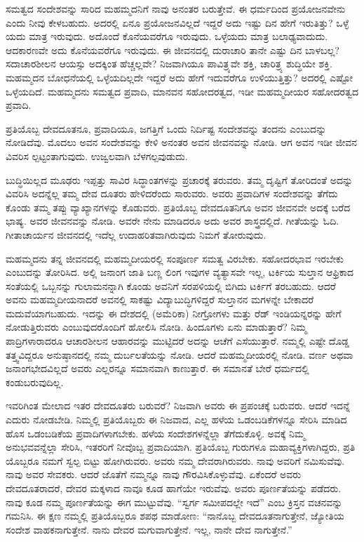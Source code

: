 ಸಮತ್ವದ ಸಂದೇಶವನ್ನು ಸಾರಿದ ಮಹಮ್ಮದನಿಗೆ ನಾವು ಅನಂತರ ಬರುತ್ತೇವೆ. ಈ ಧರ್ಮದಿಂದ ಪ್ರಯೋಜನವೇನು ಎಂದು ನೀವು ಕೇಳಬಹುದು. ಅದರಲ್ಲಿ ಏನೂ ಪ್ರಯೋಜನವಿಲ್ಲದೆ ಇದ್ದರೆ ಅದು ಇಷ್ಟು ದಿನ ಹೇಗೆ ಇರುತಿತ್ತು? ಒಳ್ಳೆ ಯದು ಮಾತ್ರ ಇರುವುದು. ಅದೊಂದೆ ಕೊನೆಯವರೆಗೂ ಇರುವುದು. ಒಳ್ಳೆಯದು ಮಾತ್ರ ಬಲಾಢ್ಯವಾದುದು. ಆದಕಾರಣವೇ ಅದು ಕೊನೆಯವರೆಗೂ ಇರುವುದು. ಈ ಜೀವನದಲ್ಲಿ ದುರಾಚಾರಿ ತಾನೇ ಎಷ್ಟು ದಿನ ಬಾಳಬಲ್ಲ? ಸದಾಚಾರಶೀಲನ ಆಯಸ್ಸು ಅದಕ್ಕಿಂತ ಹೆಚ್ಚಲ್ಲವೇ? ನಿಜವಾಗಿಯೂ ಪಾವಿತ್ರ್ಯವೇ ಶಕ್ತಿ, ಚಾರಿತ್ರ್ಯ ಶುದ್ಧಿಯೇ ಶಕ್ತಿ. ಮಹಮ್ಮದನ ಬೋಧನೆಯಲ್ಲಿ ಒಳ್ಳೆಯದಿಲ್ಲದೇ ಇದ್ದರೆ ಅದು ಹೇಗೆ ಇದುವರೆಗೂ ಉಳಿಯುತ್ತಿತ್ತು? ಅದರಲ್ಲಿ ಎಷ್ಟೋ ಒಳ್ಳೆಯದಿದೆ. ಮಹಮ್ಮದನು ಸಮತ್ವದ ಪ್ರವಾದಿ, ಮಾನವನ ಸಹೋದರತ್ವದ, ಇಡೀ ಮಹಮ್ಮದೀಯರ ಸಹೋದರತ್ವದ ಪ್ರವಾದಿ.

ಪ್ರತಿಯೊಬ್ಬ ದೇವದೂತನೂ, ಪ್ರವಾದಿಯೂ, ಜಗತ್ತಿಗೆ ಒಂದು ನಿರ್ದಿಷ್ಟ ಸಂದೇಶವನ್ನು ತಂದನು ಎಂಬುದನ್ನು ನೋಡಿದೆವು. ಮೊದಲು ಅವನ ಸಂದೇಶವನ್ನು ಕೇಳಿ ಅನಂತರ ಅವನ ಜೀವನವನ್ನು ನೋಡಿ. ಆಗ ಅವನ ಇಡೀ ಜೀವನ ವಿವರಿಸ ಲ್ಪಟ್ಟಂತಾಗುವುದು. ಉಜ್ವಲವಾಗಿ ಬೆಳಗಲ್ಪವುಡುದು.

ಬುದ್ಧಿಯಿಲ್ಲದ ಮೂಢರು ಇಪ್ಪತ್ತು ಸಾವಿರ ಸಿದ್ಧಾಂತಗಳನ್ನು ಪ್ರಚಾರಕ್ಕೆ ತರುವರು. ತಮ್ಮ ದೃಷ್ಟಿಗೆ ತೋರಿದಂತೆ ಅದನ್ನು ವಿವರಿಸಿ ಅದನ್ನೆಲ್ಲ ತಮ್ಮ ದೇವ ದೂತರು ಹೇಳಿದರೆಂದು ಸಾರುವರು. ಅವರು ಪ್ರವಾದಿಗಳ ಸಂದೇಶವನ್ನು ತೆಗೆದು ಕೊಂಡು ತಮ್ಮ ತಪ್ಪು ವ್ಯಾಖ್ಯಾನಗಳನ್ನು ಕೊಡುವರು. ಪ್ರತಿಯೊಬ್ಬ ದೇವದೂತನಿಗೂ ಅವನ ಜೀವನವೇ ಅದಕ್ಕೆ ಬರೆದ ಭಾಷ್ಯ. ಅವರ ಜೀವನವನ್ನು ನೋಡಿ. ಅವರೇ ನೇನು ಮಾಡಿದರೂ ಅದು ಅವರ ಶಾಸ್ತ್ರದಲ್ಲಿದೆ. ಗೀತೆಯನ್ನು ಓದಿ. ಗೀತಾಚಾರ್ಯನ ಜೀವನದಲ್ಲಿ ಇದೆಲ್ಲ ಉದಾಹರಿತವಾಗಿರುವುದು ನಿಮಗೆ ತೋರುವುದು.

ಮಹಮ್ಮದನು ತನ್ನ ಜೀವನದಲ್ಲಿ ಮಹಮ್ಮದೀಯರಲ್ಲಿ ಸಂಪೂರ್ಣ ಸಮತ್ವ ವಿರಬೇಕು. ಸಹೋದರಭಾವ ಇರಬೇಕು ಎಂಬುದನ್ನು ತೋರಿಸಿದ. ಅಲ್ಲಿ ಜನಾಂಗ ಜಾತಿ ಬಣ್ಣ ಲಿಂಗ ಇವುಗಳ ವ್ಯತ್ಯಾಸವೇ ಇಲ್ಲ, ಟರ್ಕಿಯ ಸುಲ್ತಾನ ಆಫ್ರಿಕಾದ ಸಂತೆಯಲ್ಲಿ ಒಬ್ಬನನ್ನು ಗುಲಾಮನನ್ನಾಗಿ ಕೊಂಡು ಅವನಿಗೆ ಸರಪಳಿಯಲ್ಲಿ ಬಿಗಿದು ಟರ್ಕಿಗೆ ತರಬಹುದು. ಆದರೆ ಅವನು ಮಹಮ್ಮದೀಯನಾದರೆ ಅವನಲ್ಲಿ ಸಾಕಷ್ಟು ವಿದ್ಯಾಬುದ್ಧಿಗಳಿದ್ದರೆ ಸುಲ್ತಾನನ ಮಗಳನ್ನೇ ಬೇಕಾದರೆ ಮದುವೆಯಾಗಬಹುದು. ಇದನ್ನು ಈ ದೇಶದಲ್ಲಿ (ಅಮೆರಿಕಾ) ನೀಗ್ರೋಗಳು ಮತ್ತು ರೆಡ್​ ಇಂಡಿಯನ್ನರನ್ನು ಹೇಗೆ ನೋಡುತ್ತಿರುವರು ಎಂಬುವುದರೊಂದಿಗೆ ಹೋಲಿಸಿ ನೋಡಿ. ಹಿಂದೂಗಳು ಏನು ಮಾಡುತ್ತಾರೆ? ನಿಮ್ಮ ಪಾದ್ರಿಗಳಾರಾದರೂ ಆಚಾರಶೀಲನ ಆಹಾರವನ್ನು ಮುಟ್ಟಿದರೆ ಅದನ್ನು ಆಚೆಗೆ ಎಸೆಯುತ್ತಾರೆ. ನಮ್ಮಲ್ಲಿ ಎಷ್ಟೇ ದೊಡ್ಡ ತತ್ತ್ವವಿದ್ದರೂ ಅನುಷ್ಠಾನದಲ್ಲಿ ನಮ್ಮ ದುರ್ಬಲತೆಯನ್ನು ನೋಡಿ. ಆದರೆ ಮಹಮ್ಮದೀಯರಲ್ಲಿ ನೋಡಿ. ವರ್ಣ ಅಥವಾ ಜನಾಂಗಭೇದವಿಲ್ಲದೆ ಅವರು ಎಲ್ಲರನ್ನೂ ಸಮಾನವಾಗಿ ಕಾಣುತ್ತಾರೆ. ಈ ಸಮಾನತೆ ಬೇರೆ ಧರ್ಮದಲ್ಲಿ ಕಂಡುಬರುವುದಿಲ್ಲ.

ಇವರಿಗಿಂತ ಮೇಲಾದ ಇತರ ದೇವದೂತರು ಬರುವರೆ? ನಿಜವಾಗಿ ಅವರು ಈ ಪ್ರಪಂಚಕ್ಕೆ ಬರುವರು. ಆದರೆ ಇದನ್ನೆ ಎದುರು ನೋಡಬೇಡಿ. ನಿಮ್ಮಲ್ಲಿ ಪ್ರತಿಯೊಬ್ಬರು ಈ ನಿಜವಾದ, ಎಲ್ಲ ಹಳೆಯ ಒಡಂಬಡಿಕೆಗಳನ್ನೂ ಸೇರಿಸಿ ಮಾಡಿದ ಹೊಸ ಒಡಂಬಡಿಕೆಯ ಪ್ರವಾದಿಗಳಾಗಬೇಕು. ಹಳೆಯ ಸಂದೇಶಗಳನ್ನೆಲ್ಲಾ ತೆಗೆದುಕೊಳ್ಳಿ. ಅವಕ್ಕೆ ನಿಮ್ಮ ಅನುಭವವನ್ನೆಲ್ಲಾ ಸೇರಿಸಿ, ಇತರರಿಗೆ ನೀವೊಬ್ಬ ಪ್ರವಾದಿಯಾಗಿ. ಪ್ರತಿಯೊಬ್ಬ ಗುರುಗಳೂ ಮಹಾವ್ಯಕ್ತಿಗಳಾಗಿದ್ದರು, ಪ್ರತಿ ಯೊಬ್ಬರೂ ನಮಗೆ ಸ್ವಲ್ಪ ಬಿಟ್ಟು ಹೋಗಿರುವರು. ಅವರು ನಮ್ಮ ದೇವರಾಗಿರುವರು. ನಾವು ಅವರಿಗೆ ನಮಿಸುವೆವು. ನಾವು ಅವರ ಸೇವಕರು. ಆದರೆ ಜೊತೆಗೆ ನಮ್ಮನ್ನೂ ನಾವು ಗೌರವಿಸಿಕೊಳ್ಳುವೆವು. ಏಕೆಂದರೆ ಅವರು ದೇವದೂತರಾದರೆ, ದೇವರ ಮಕ್ಕಳಾದ ನಾವೂ ಕೂಡ ಹಾಗೆಯೇ ಇರುವೆವು. ಅವರು ಪೂರ್ಣತೆಯನ್ನು ಪಡೆದರು. ನಾವು ಕೂಡ ನಮ್ಮ ಪೂರ್ಣತೆಯನ್ನು ಈಗ ಮುಟ್ಟುವೆವು. “ಸ್ವರ್ಗ ಸಮೀಪದಲ್ಲೇ ಇದೆ” ಎಂಬ ಕ್ರಿಸ್ತನ ವಚನವನ್ನು ಗಮನಿಸಿ. ಈ ಕ್ಷಣ ನಮ್ಮಲ್ಲಿ ಪ್ರತಿಯೊಬ್ಬರೂ ಶಪಥ ಮಾಡೋಣ: “ನಾನೊಬ್ಬ ದೇವದೂತನಾಗುತ್ತೇನೆ, ಜ್ಯೋತಿಯ ಸಂದೇಶ ವಾಹಕನಾಗುತ್ತೇನೆ. ನಾನು ದೇವರ ಮಗುವಾಗುತ್ತೇನೆ. ಇಲ್ಲ, ನಾನೇ ದೇವ ನಾಗುತ್ತೇನೆ.”

